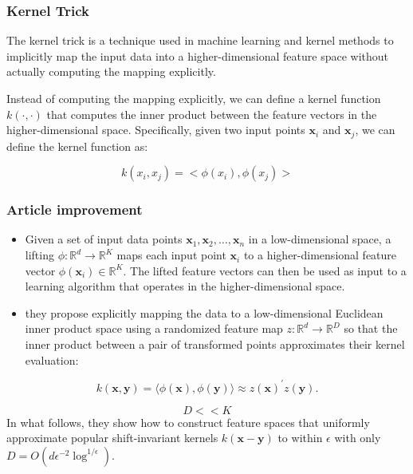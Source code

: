\begin{frame}
  \frametitle{Kernel Trick}
  The kernel trick is a technique used in machine learning and kernel methods to implicitly map the input data into a higher-dimensional feature space without actually computing the mapping explicitly.

  Instead of computing the mapping explicitly, we can define a kernel function $k(\cdot,\cdot)$ that computes the inner product between the feature vectors in the higher-dimensional space. Specifically, given two input points $\mathbf{x}_i$ and $\mathbf{x}_j$, we can define the kernel function as:

  \begin{equation}
    k(x_i, x_j) 
    = 
    < \phi(x_i), \phi(x_j)>
  \end{equation}
  
\end{frame}

\begin{frame}
  \frametitle{Article improvement}

  \begin{itemize}
    \item Given a set of input data points ${\mathbf{x}_1,\mathbf{x}_2,\ldots,\mathbf{x}_n}$ in a low-dimensional space, a lifting $\phi:\mathbb{R}^d\rightarrow\mathbb{R}^K$ maps each input point $\mathbf{x}_i$ to a higher-dimensional feature vector $\phi(\mathbf{x}_i)\in\mathbb{R}^K$. The lifted feature vectors can then be used as input to a learning algorithm that operates in the higher-dimensional space.
    \item they propose explicitly mapping the data to a low-dimensional Euclidean inner product space using a randomized feature map $z:\mathbb{R}^d\rightarrow\mathbb{R}^D$ so that the inner product between a pair of transformed points approximates their kernel evaluation:
  \end{itemize}

  \begin{equation}
    k(\mathbf{x},\mathbf{y}) = \langle \phi(\mathbf{x}), \phi(\mathbf{y}) \rangle \approx z(\mathbf{x})^\prime z(\mathbf{y}). 
    \end{equation}

    \begin{equation}
      D << K
    \end{equation}
    In what follows, they show how to construct feature spaces that uniformly approximate popular shift-invariant kernels $k(\mathbf{x}-\mathbf{y})$ to within $\epsilon$ with only $D = O(d\epsilon^{-2}\log^{1/\epsilon})$.

\end{frame}

